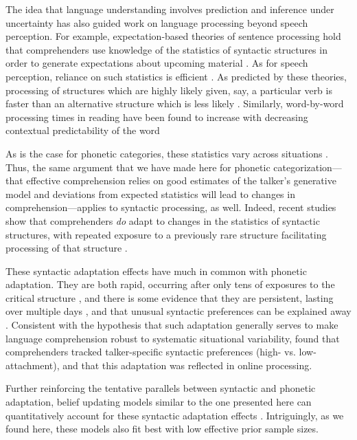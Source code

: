 The idea that language understanding involves prediction and inference under uncertainty has also guided work on language processing beyond speech perception. For example, expectation-based theories of sentence processing hold that comprehenders use knowledge of the statistics of syntactic structures in order to generate expectations about upcoming material \autocite{Hale2001,Levy2008,MacDonald1994,MacDonald2013,Tanenhaus1995}.
As for speech perception, reliance on such statistics is efficient \autocite{Levy2008,Smith2013}. As predicted by these theories, processing of structures which are highly likely given, say, a particular verb is faster than an alternative structure which is less likely \autocite{Garnsey1997,MacDonald1994,Staub2006,Trueswell1994}. Similarly, word-by-word processing times in reading have been found to increase with decreasing contextual predictability of the word \autocite[specifically, its contextual surprisal,][]{Demberg2008,Hale2001,Frank2011}

As is the case for phonetic categories, these statistics vary across situations \autocite[see][for references]{Fine2013}.  Thus, the same argument that we have made here for phonetic categorization---that effective comprehension relies on good estimates of the talker's generative model and deviations from expected statistics will lead to changes in comprehension---applies to syntactic processing, as well.  Indeed, recent studies show that comprehenders \emph{do} adapt to changes in the statistics of syntactic structures, with repeated exposure to a previously rare structure facilitating processing of that structure \autocite{Fine2010,Fine2013,Jaeger2013a,Kaschak2004}.

These syntactic adaptation effects have much in common with phonetic adaptation.  They are both rapid, occurring after only tens of exposures to the critical structure \autocite{Fine2013,Kaschak2004}, and there is some evidence that they are persistent, lasting over multiple days \autocite{Wells2009}, and that unusual syntactic preferences can be explained away \autocite{Hanulikova2012}.  Consistent with the hypothesis that such adaptation generally serves to make language comprehension robust to systematic situational variability, \textcite{Kamide2012} found that comprehenders tracked talker-specific syntactic preferences (high- vs. low-attachment), and that this adaptation was reflected in online processing.

Further reinforcing the tentative parallels between syntactic and phonetic adaptation, belief updating models similar to the one presented here can quantitatively account for these syntactic adaptation effects \autocite{Fine2010,Kleinschmidt2012b}.  Intriguingly, as we found here, these models also fit best with low effective prior sample sizes.


